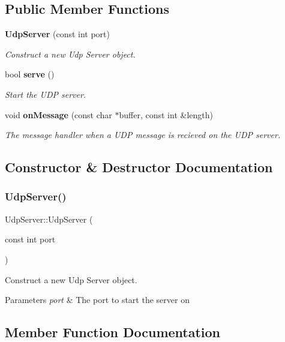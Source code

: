 \subsection*{Public Member Functions}
\begin{DoxyCompactItemize}
\item 
\textbf{ Udp\+Server} (const int port)
\begin{DoxyCompactList}\small\item\em Construct a new Udp Server object. \end{DoxyCompactList}\item 
bool \textbf{ serve} ()
\begin{DoxyCompactList}\small\item\em Start the U\+DP server. \end{DoxyCompactList}\item 
void \textbf{ on\+Message} (const char $\ast$buffer, const int \&length)
\begin{DoxyCompactList}\small\item\em The message handler when a U\+DP message is recieved on the U\+DP server. \end{DoxyCompactList}\end{DoxyCompactItemize}


\subsection{Constructor \& Destructor Documentation}
\mbox{\label{class_udp_server_abb91737f6586814939681baabb0cf9c7}} 
\subsubsection{Udp\+Server()}
{\footnotesize\ttfamily Udp\+Server\+::\+Udp\+Server (\begin{DoxyParamCaption}\item[{const int}]{port }\end{DoxyParamCaption})}



Construct a new Udp Server object. 


\begin{DoxyParams}{Parameters}
{\em port} & The port to start the server on \\
\hline
\end{DoxyParams}


\subsection{Member Function Documentation}
\mbox{\label{class_udp_server_a70af3b18fec2cc3368bdc7ef9621e29d}} 
